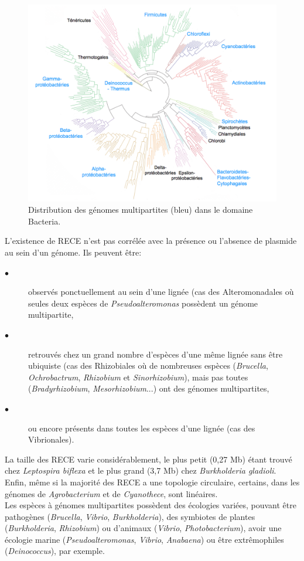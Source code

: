 \begin{figure}[H]
	\begin{center}
	\includegraphics[height=0.4\textheight]{./img/figphylgeco.png}
	\caption[Distribution des génomes multipartites dans le domaine Bacteria]{Distribution des génomes multipartites (bleu) dans le domaine Bacteria.}\label{figphylgeco}
	 \end{center}
 \end{figure} 

	L'existence de RECE n'est pas corrélée avec la présence ou l'absence de plasmide au sein d'un génome. Ils peuvent être:
\begin{description}
      \item[$\bullet$] observés ponctuellement au sein d'une lignée (cas des Alteromonadales où seules deux espèces de \textit{Pseudoalteromonas} possèdent un génome multipartite,
      \item[$\bullet$] retrouvés chez un grand nombre d'espèces d'une même lignée sans être ubiquiste (cas des Rhizobiales où de nombreuses espèces (\textit{Brucella}, \textit{Ochrobactrum}, \textit{Rhizobium} et \textit{Sinorhizobium}), mais pas toutes (\textit{Bradyrhizobium}, \textit{Mesorhizobium}...) ont des génomes multipartites,
      \item[$\bullet$] ou encore présents dans toutes les espèces d'une lignée (cas des Vibrionales).
\end{description}
       La taille des RECE varie considérablement, le plus petit (0,27 Mb) étant trouvé chez \textit{Leptospira biflexa} et le plus grand  (3,7 Mb) chez \textit{Burkholderia gladioli}. Enfin, même si la majorité des RECE a une topologie circulaire, certains, dans les génomes de \textit{Agrobacterium} et de \textit{Cyanothece}, sont linéaires.\\
      Les espèces à génomes multipartites possèdent des écologies variées, pouvant être pathogènes (\textit{Brucella}, \textit{Vibrio}, \textit{Burkholderia}), des symbiotes de plantes (\textit{Burkholderia}, \textit{Rhizobium}) ou d'animaux (\textit{Vibrio}, \textit{Photobacterium}), avoir une écologie marine (\textit{Pseudoalteromonas}, \textit{Vibrio}, \textit{Anabaena}) ou être extrêmophiles (\textit{Deinococcus}), par exemple. 
     

